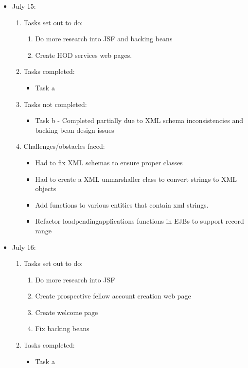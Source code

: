 	\begin{itemize}
	\item July 15:
	\begin{enumerate}
		\item Tasks set out to do:
		\begin{enumerate}
			\item Do more research into JSF and backing beans
			\item Create HOD services web pages. 				
		\end{enumerate}
		\item Tasks completed:
		\begin{itemize}
			\item Task a								
		\end{itemize}
		\item Tasks not completed:
		\begin{itemize}
			\item Task b - Completed partially due to XML schema inconsistencies and backing bean design issues 
		\end{itemize}
		\item Challenges/obstacles faced:
		\begin{itemize}
			\item Had to fix XML schemas to ensure proper classes
			\item Had to create a XML unmarshaller class to convert strings to XML objects
			\item Add functions to various entities that contain xml strings.
			\item Refactor loadpendingapplications functions in EJBs to support record range
		\end{itemize}			
	\end{enumerate}
	\item July 16:
	\begin{enumerate}
		\item Tasks set out to do:
		\begin{enumerate}
			\item Do more research into JSF
			\item Create prospective fellow account creation web page
			\item Create welcome page
			\item Fix backing beans				
		\end{enumerate}
		\item Tasks completed:
		\begin{itemize}
			\item Task a

\end{itemize}
\end{enumerate}
\end{itemize}
